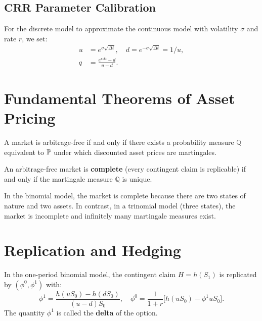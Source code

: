 \subsection{CRR Parameter Calibration}

For the discrete model to approximate the continuous model with volatility
$\sigma$ and rate $r$, we set:
\begin{align}
    u &= e^{\sigma\sqrt{\Delta t}}, \quad d = e^{-\sigma\sqrt{\Delta t}} = 1/u, \\
    q &= \frac{e^{r\Delta t} - d}{u - d}.
\end{align}

\section{Fundamental Theorems of Asset Pricing}

\begin{theorem}
\label{thm:ftap1}
A market is arbitrage-free if and only if there exists a probability measure
$\mathbb{Q}$ equivalent to $\mathbb{P}$ under which discounted asset prices are
martingales.
\end{theorem}

\begin{theorem}
\label{thm:ftap2}
An arbitrage-free market is \textbf{complete} (every contingent claim is
replicable) if and only if the martingale measure $\mathbb{Q}$ is unique.
\end{theorem}

\begin{remark}
In the binomial model, the market is complete because there are two states
of nature and two assets. In contrast, in a trinomial model (three states),
the market is incomplete and infinitely many martingale measures exist.
\end{remark}

\section{Replication and Hedging}

\begin{proposition}
In the one-period binomial model, the contingent claim $H = h(S_1)$ is
replicated by $(\phi^0, \phi^1)$ with:
\[
    \phi^1 = \frac{h(uS_0) - h(dS_0)}{(u-d)S_0}, \quad
    \phi^0 = \frac{1}{1+r}\bigl[h(uS_0) - \phi^1 uS_0\bigr].
\]
The quantity $\phi^1$ is called the \textbf{delta} of the option.
\end{proposition}


